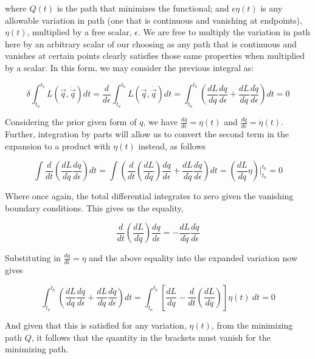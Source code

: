 \documentclass{article}\usepackage[]{graphicx}\usepackage[]{color}
\begin{document}
where $Q(t)$ is the path that minimizes the functional; and $\epsilon\eta(t)$ is any allowable variation in path (one that is continuous and vanishing at endpoints),$\eta(t)$, multiplied by a free scalar, $\epsilon$. We are free to multiply the variation in path here by an arbitrary scalar of our choosing as any path that is continuous and vanishes at certain points clearly satisfies those same properties when multiplied by a scalar. In this form, we may consider the previous integral as:

\begin{equation}
\delta\int^{t_b}_{t_a}L(\vec{q},\dot{\vec{q}})dt=\frac{d}{d\epsilon}\int^{t_b}_{t_a}L(\vec{q},\dot{\vec{q}})dt=\int^{t_b}_{t_a}\left( \frac{dL}{dq}\frac{dq}{d\epsilon}+\frac{dL}{d\dot{q}}\frac{d\dot{q}}{d\epsilon}\right) dt=0
\end{equation}

Considering the prior given form of $q$, we have $\frac{dq}{d\epsilon}=\eta(t)$ and $\frac{d\dot{q}}{d\epsilon}=\dot{\eta}(t)$. Further, integration by parts will allow us to convert the second term in the expansion to a product with $\eta(t)$ instead, as follows



$$\int\frac{d}{dt}\left( \frac{dL}{d\dot{q}}\frac{dq}{d\epsilon} \right) dt
=\int\left(\frac{d}{dt}\left(\frac{dL}{d\dot{q}}\right)\frac{dq}{d\epsilon}+\frac{dL}{d\dot{q}}\frac{d\dot{q}}{d\epsilon}\right)dt=\left( \frac{dL}{d\dot{q}}\eta \right) \vert^{t_b}_{t_a}=0
$$
 
Where once again, the total differential integrates to zero given the vanishing boundary conditions. This gives us the equality,

$$
\frac{d}{dt}\left(\frac{dL}{d\dot{q}}\right)\frac{dq}{d\epsilon}=-\frac{dL}{d\dot{q}}\frac{d\dot{q}}{d\epsilon}
$$

Substituting in $\frac{dq}{d\epsilon}=\eta$ and the above equality into the expanded variation now gives

\begin{equation}
\int^{t_b}_{t_a}\left( \frac{dL}{dq}\frac{dq}{d\epsilon}+\frac{dL}{d\dot{q}}\frac{d\dot{q}}{d\epsilon}\right) dt=\int^{t_b}_{t_a}\left[ \frac{dL}{dq} -\frac{d}{dt}\left( \frac{dL}{d\dot{q}}\right)  \right] \eta(t) \ dt=0
\end{equation}

And given that this is satisfied for any variation, $\eta(t)$, from the minimizing path $Q$, it follows that the quantity in the brackets must vanish for the minimizing path.
\end{document}
